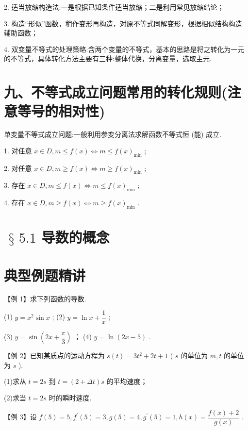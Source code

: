 2. 适当放缩构造法:一是根据已知条件适当放缩；二是利用常见放缩结论；

3. 构造“形似”函数，稍作变形再构造，对原不等式同解变形，根据相似结构构造辅助函数；

4. 双变量不等式的处理策略:含两个变量的不等式，基本的思路是将之转化为一元的不等式，具体转化方法主要有三种:整体代换，分离变量，选取主元.

\section*{九、不等式成立问题常用的转化规则(注意等号的相对性)}

单变量不等式成立问题:一般利用参变分离法求解函数不等式恒 (能) 成立.

1. 对任意 $x \in  D,m \leq  f\left( x\right)  \Leftrightarrow  m \leq  f{\left( x\right) }_{\min }$ ;

2. 对任意 $x \in  D,m \geq  f\left( x\right)  \Leftrightarrow  m \geq  f{\left( x\right) }_{\min }$ ;

3. 存在 $x \in  D,m \leq  f\left( x\right)  \Leftrightarrow  m \leq  f{\left( x\right) }_{\min }$ ;

4. 存在 $x \in  D,m \geq  f\left( x\right)  \Leftrightarrow  m \geq  f{\left( x\right) }_{\min }$ .

\section*{$\text{ § }{5.1}$ 导数的概念}

\section*{典型例题精讲}

【例 1】求下列函数的导数.

(1) $y = {x}^{2}\sin x$ ; (2) $y = \ln x + \dfrac{1}{x}$ ;

(3) $y = \sin \left( {{2x} + \dfrac{\pi }{3}}\right)$ ； (4) $y = \ln \left( {{2x} - 5}\right)$ .

【例 2】已知某质点的运动方程为 $s\left( t\right)  = 3{t}^{2} + {2t} + 1$ ( $s$ 的单位为 ${m},t$ 的单位为 ${s}$ ).

(1)求从 $t = {2{s}}$ 到 $t = \left( {2 + {\Delta t}}\right) {s}$ 的平均速度；

(2)求当 $t = {2{s}}$ 时的瞬时速度.

【例 3】设 $f\left( 5\right)  = 5,{f}^{\prime }\left( 5\right)  = 3,g\left( 5\right)  = 4,{g}^{\prime }\left( 5\right)  = 1,h\left( x\right)  = \dfrac{f\left( x\right)  + 2}{g\left( x\right) }$ .

